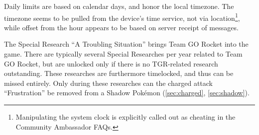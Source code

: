 Daily limits are based on calendar days, and honor the local timezone.
The timezone seems to be pulled from the device's time service, not via location\footnote{Manipulating
 the system clock is explicitly called out as cheating in the Community Ambassador FAQs.},
 while offset from the hour appears to be based on server receipt of messages.

The Special Research ``A Troubling Situation'' brings Team GO Rocket into the game.
There are typically several Special Researches per year related to Team GO Rocket,
 but are unlocked only if there is no TGR-related research outstanding.
These researches are furthermore timelocked, and thus can be missed entirely.
Only during these researches can the charged attack ``Frustration'' be removed
 from a Shadow Pokémon (\autoref{sec:charged}, \autoref{sec:shadow}).

